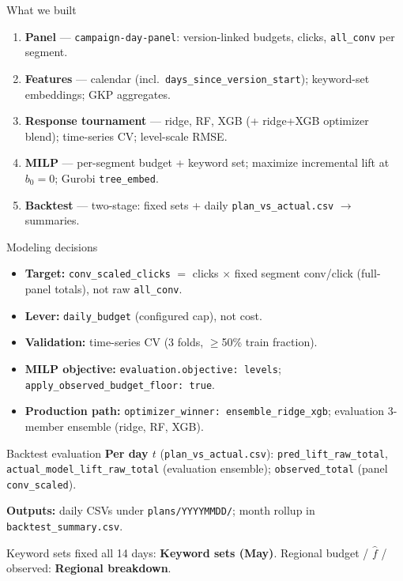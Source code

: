 \documentclass[11pt]{beamer}
\begin{document}
\begin{frame}{What we built}
  \begin{enumerate}
    \item \textbf{Panel} --- \texttt{campaign-day-panel}: version-linked budgets, clicks, \texttt{all\_conv} per segment.
    \item \textbf{Features} --- calendar (incl.\ \texttt{days\_since\_version\_start}); keyword-set embeddings; GKP aggregates.
    \item \textbf{Response tournament} --- ridge, RF, XGB (+ ridge+XGB optimizer blend); time-series CV; level-scale RMSE.
    \item \textbf{MILP} --- per-segment budget + keyword set; maximize incremental lift at $b_0{=}0$; Gurobi \texttt{tree\_embed}.
    \item \textbf{Backtest} --- two-stage: fixed sets + daily \texttt{plan\_vs\_actual.csv} $\rightarrow$ summaries.
  \end{enumerate}
\end{frame}

\begin{frame}{Modeling decisions}
  \begin{itemize}
    \item \textbf{Target:} \texttt{conv\_scaled\_clicks} $=$ clicks $\times$ fixed segment conv/click (full-panel totals), not raw \texttt{all\_conv}.
    \item \textbf{Lever:} \texttt{daily\_budget} (configured cap), not cost.
    \item \textbf{Validation:} time-series CV (3 folds, $\geq$50\% train fraction).
    \item \textbf{MILP objective:} \texttt{evaluation.objective: levels}; \texttt{apply\_observed\_budget\_floor: true}.
    \item \textbf{Production path:} \texttt{optimizer\_winner: ensemble\_ridge\_xgb}; evaluation 3-member ensemble (ridge, RF, XGB).
  \end{itemize}
\end{frame}

\begin{frame}{Backtest evaluation}
  \textbf{Per day $t$} (\texttt{plan\_vs\_actual.csv}):
  \texttt{pred\_lift\_raw\_total}, \texttt{actual\_model\_lift\_raw\_total} (evaluation ensemble);
  \texttt{observed\_total} (panel \texttt{conv\_scaled}).

  \vspace{0.35em}
  \textbf{Outputs:} daily CSVs under \texttt{plans/YYYYMMDD/}; month rollup in \texttt{backtest\_summary.csv}.

  \vspace{0.25em}
  {\footnotesize Keyword sets fixed all 14 days: \textbf{Keyword sets (May)}.
  Regional budget / $\hat f$ / observed: \textbf{Regional breakdown}.}
\end{frame}
\end{document}
